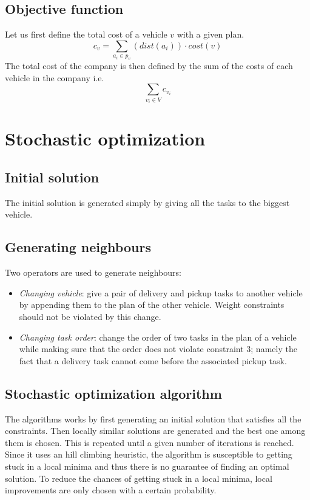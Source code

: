 \documentclass[11pt]{article}
\begin{document}
\subsection{Objective function}
Let us first define the total cost of a vehicle $v$ with a given plan. $$c_v =
\sum_{a_i \in p_v} (dist(a_i))\cdot cost(v)$$
The total cost of the company is then defined by the sum of the costs of each
vehicle in the company i.e.
$$\sum_{v_i \in V} c_{v_i}$$

\section{Stochastic optimization}

\subsection{Initial solution}
The initial solution is generated simply by giving all the tasks to the biggest
vehicle.

\subsection{Generating neighbours}
Two operators are used to generate neighbours:
\begin{itemize}
\item \textit{Changing vehicle}: give a pair of delivery and pickup tasks to
  another vehicle by appending them to the plan of the other vehicle. Weight
  constraints should not be violated by this change. 
\item \textit{Changing task order}: change the order of two tasks in the plan of
  a vehicle while making sure that the order does not violate constraint $3$;
  namely the fact that a delivery task cannot come before the associated pickup
  task.
\end{itemize}

\subsection{Stochastic optimization algorithm}
The algorithms works by first generating an initial solution that satisfies all
the constraints. Then locally similar solutions are generated and the best one
among them is chosen. This is repeated until a given number of iterations is
reached. Since it uses an hill climbing heuristic, the algorithm is susceptible
to getting stuck in a local minima and thus there is no guarantee of finding an
optimal solution. To reduce the chances of getting stuck in a local minima,
local improvements are only chosen with a certain probability.
\end{document}
